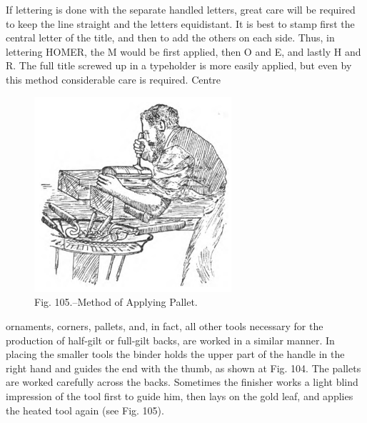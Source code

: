 \documentclass[twoside]{book}
\begin{document}
If lettering is done with the separate handled
letters, great care will be required to keep the line
straight and the letters equidistant. It is best to
stamp first the central letter of the title, and then to
add the others on each side. Thus, in lettering
HOMER, the M would be first applied, then O and
E, and lastly H and R. The full title screwed up
in a typeholder is more easily applied, but even by
this method considerable care is required. Centre
	\begin{figure}[h]
		\centering
		\includegraphics[width=0.65\textwidth]{Figures/_105.png}
		\caption*{Fig. 105.--Method of Applying Pallet.}
	\end{figure}
ornaments, corners, pallets, and, in fact, all other
tools necessary for the production of half-gilt or
full-gilt backs, are worked in a similar manner. In
placing the smaller tools the binder holds the upper
part of the handle in the right hand and guides the
end with the thumb, as shown at Fig. 104. The
pallets are worked carefully across the backs.
Sometimes  the finisher works a light blind impression
of the tool first to guide him, then lays on the gold
leaf, and applies the heated tool again (see Fig. 105).
\end{document}

